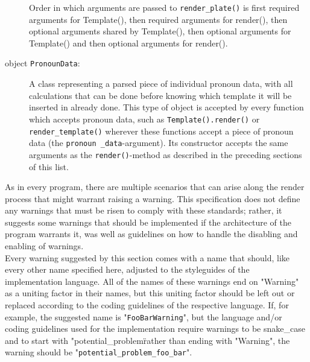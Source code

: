 \documentclass{article}
\newcounter{subsubsubsection}[subsubsection]
\begin{document}
\begin{description}
                                                     Order in which arguments are passed to \texttt{render\_plate()} is first required arguments for Template(), then required arguments for render(), then optional arguments shared by Template(), then optional arguments for Template() and then optional arguments for render().
        \item[object \texttt{PronounData}:] A class representing a parsed piece of individual pronoun data, with all calculations that can be done before knowing which template it will be inserted in already done.
                                            This type of object is accepted by every function which accepts pronoun data, such as \texttt{Template().render()} or \texttt{render\_template()} wherever these functions accept a piece of pronoun data (the \texttt{pronoun \_data}-argument).
                                            Its constructor accepts the same arguments as the  \texttt{render()}-method as described in the preceding sections of this list.
    \end{description}


    As in every program, there are multiple scenarios that can arise along the render process that might warrant raising a warning.
    This specification does not define any warnings that must be risen to comply with these standards;
    rather, it suggests some warnings that should be implemented if the architecture of the program warrants it, was well as guidelines on how to handle the disabling and enabling of warnings.\\

    Every warning suggested by this section comes with a name that should, like every other name specified here, adjusted to the styleguides of the implementation language.
    All of the names of these warnings end on "Warning" as a uniting factor in their names, but this uniting factor should be left out or replaced according to the coding guidelines of the respective language.
    If, for example, the suggested name is "\texttt{FooBarWarning}", but the language and/or coding guidelines used for the implementation require warnings to be snake\_case and to start with "potential\_problem\" rather than ending with "Warning", the warning should be "\texttt{potential\_problem\_foo\_bar}".\\
\end{document}
